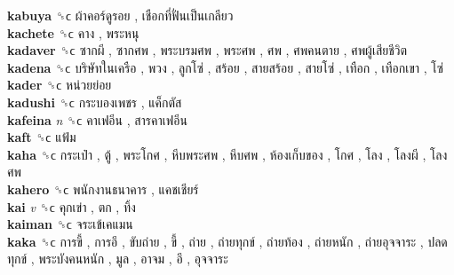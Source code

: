 \textbf{kabuya} ␝ϲ   ผ้าคอร์ดูรอย ,  เชือกที่ฟั่นเป็นเกลียว   \\
\textbf{kachete} ␝ϲ   คาง ,  พระหนุ   \\
\textbf{kadaver} ␝ϲ   ซากผี ,  ซากศพ ,  พระบรมศพ ,  พระศพ ,  ศพ ,  ศพคนตาย ,  ศพผู้เสียชีวิต   \\
\textbf{kadena} ␝ϲ   บริษัทในเครือ ,  พวง ,  ลูกโซ่ ,  สร้อย ,  สายสร้อย ,  สายโซ่ ,  เทือก ,  เทือกเขา ,  โซ่   \\
\textbf{kader} ␝ϲ   หน่วยย่อย   \\
\textbf{kadushi} ␝ϲ   กระบองเพชร ,  แค็กตัส   \\
\textbf{kafeina} \emph{n}  ␝ϲ   คาเฟอีน ,  สารคาเฟอีน   \\
\textbf{kaft} ␝ϲ   แฟ้ม   \\
\textbf{kaha} ␝ϲ   กระเป๋า ,  ตู้ ,  พระโกศ ,  หีบพระศพ ,  หีบศพ ,  ห้องเก็บของ ,  โกศ ,  โลง ,  โลงผี ,  โลงศพ   \\
\textbf{kahero} ␝ϲ   พนักงานธนาคาร ,  แคชเชียร์   \\
\textbf{kai} \emph{v}  ␝ϲ   คุกเข่า ,  ตก ,  ทิ้ง   \\
\textbf{kaiman} ␝ϲ   จระเข้เคแมน   \\
\textbf{kaka} ␝ϲ   การขี้ ,  การอึ ,  ขับถ่าย ,  ขี้ ,  ถ่าย ,  ถ่ายทุกข์ ,  ถ่ายท้อง ,  ถ่ายหนัก ,  ถ่ายอุจจาระ ,  ปลดทุกข์ ,  พระบังคนหนัก ,  มูล ,  อาจม ,  อึ ,  อุจจาระ   \\
